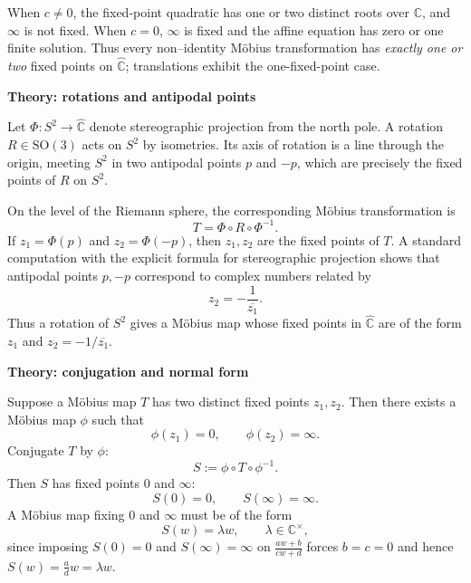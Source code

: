 \begin{problem}
When $c\ne0$, the fixed-point quadratic has one or two distinct
roots over $\mathbb C$, and $\infty$ is not fixed.  When $c=0$,
$\infty$ is fixed and the affine equation has zero or one finite
solution.  Thus every non--identity M\"obius transformation has
\emph{exactly one or two} fixed points on $\widehat{\mathbb C}$;
translations exhibit the one-fixed-point case.

\par\medskip\noindent\textbf{Theory: rotations and antipodal points}\par\smallskip


Let $\Phi:S^{2}\to\widehat{\mathbb{C}}$ denote stereographic projection
from the north pole.  A rotation $R\in\mathrm{SO}(3)$ acts on $S^{2}$ by
isometries.  Its axis of rotation is a line through the origin, meeting
$S^{2}$ in two antipodal points $p$ and $-p$, which are precisely the fixed
points of $R$ on $S^{2}$.

On the level of the Riemann sphere, the corresponding M\"obius
transformation is
\[
T = \Phi\circ R\circ\Phi^{-1}.
\]
If $z_{1}=\Phi(p)$ and $z_{2}=\Phi(-p)$, then $z_{1},z_{2}$ are the fixed
points of $T$.  A standard computation with the explicit formula for
stereographic projection shows that antipodal points $p,-p$ correspond to
complex numbers related by
\[
z_{2} = -\frac{1}{\overline{z_{1}}}.
\]
Thus a rotation of $S^{2}$ gives a M\"obius map whose fixed points in
$\widehat{\mathbb{C}}$ are of the form $z_{1}$ and
$z_{2} = -1/\overline{z_{1}}$.

\par\medskip\noindent\textbf{Theory: conjugation and normal form}\par\smallskip


Suppose a M\"obius map $T$ has two distinct fixed points $z_{1},z_{2}$.  Then
there exists a M\"obius map $\phi$ such that
\[
\phi(z_{1})=0,\qquad \phi(z_{2})=\infty.
\]
Conjugate $T$ by $\phi$:
\[
S := \phi\circ T\circ\phi^{-1}.
\]
Then $S$ has fixed points $0$ and $\infty$:
\[
S(0)=0,\qquad S(\infty)=\infty.
\]
A M\"obius map fixing $0$ and $\infty$ must be of the form
\[
S(w) = \lambda w,\qquad \lambda\in\mathbb{C}^{\times},
\]
since imposing $S(0)=0$ and $S(\infty)=\infty$ on
$\frac{aw+b}{cw+d}$ forces $b=c=0$ and hence $S(w)=\frac{a}{d}w=\lambda w$.


\end{problem}

